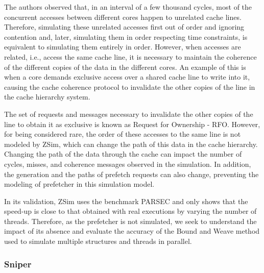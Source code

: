 \documentclass[AMA,final,STIX1COL]{WileyNJD-v2}
\begin{document}
The authors observed that, in an interval of a few thousand cycles, most of the concurrent accesses between different cores happen to unrelated cache lines.
Therefore, simulating these unrelated accesses first out of order and ignoring contention and, later, simulating them in order respecting time constraints, is equivalent to simulating them entirely in order.
However, when accesses are related, i.e., access the same cache line, it is necessary to maintain the coherence of the different copies of the data in the different cores.
An example of this is when a core demands exclusive access over a shared cache line to write into it, causing the cache coherence protocol to invalidate the other copies of the line in the cache hierarchy system.

The set of requests and messages necessary to invalidate the other copies of the line to obtain it as exclusive is known as Request for Ownership - RFO.
However, for being considered rare, the order of these accesses to the same line is not modeled by ZSim, which can change the path of this data in the cache hierarchy.
Changing the path of the data through the cache can impact the number of cycles, misses, and coherence messages observed in the simulation.
In addition, the generation and the paths of prefetch requests can also change, preventing the modeling of prefetcher in this simulation model.

In its validation, ZSim uses the benchmark PARSEC \cite{bienia2008parsec} and only shows that the speed-up is close to that obtained with real executions by varying the number of threads.
Therefore, as the prefetcher is not simulated, we seek to understand the impact of its absence and evaluate the accuracy of the Bound and Weave method used to simulate multiple structures and threads in parallel. 

\subsubsection{Sniper}
\label{subsubsec:sniper}
\end{document}
